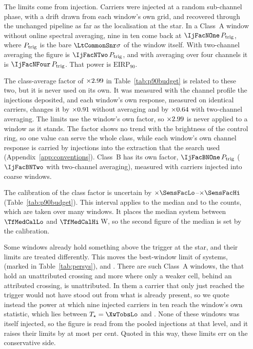 The limits come from injection. Carriers were injected at a random
sub-channel phase, with a drift drawn from each window's own grid, and
recovered through the unchanged pipeline as far as the localisation at the
star. In a Class~A window without online spectral averaging, nine in ten
come back at $\IjFacNOne\,P_{\rm trig}$, where $P_{\rm trig}$ is the bare
$\LtCommonSnr\sigma$ of the window itself. With two-channel averaging the
figure is $\IjFacNTwo\,P_{\rm trig}$, and with averaging over four channels
it is $\IjFacNFour\,P_{\rm trig}$. That power is $\mathrm{EIRP}_{90}$.

The class-average factor of $\times2.99$ in
Table~\ref{tab:p90budget} is related to these two, but it is never used on
its own. It was measured with the channel profile the injections deposited,
and each window's own response, measured on identical carriers, changes it
by $\times0.91$ without averaging and by $\times0.64$ with
two-channel averaging. The limits use the window's own factor, so
$\times2.99$ is never applied to a window as it stands. The
factor shows no trend with the brightness of the control ring, so one value
can serve the whole class, while each window's own channel response is
carried by injections into the extraction that the search used
(Appendix~\ref{app:conventions}). Class~B has its own factor,
$\IjFacBNOne\,P_{\rm trig}$ ($\IjFacBNTwo$ with two-channel averaging),
measured with \SensNToneCoarse{} carriers injected into \SensNInjCoarse{}
coarse windows.

The calibration of the class factor is uncertain by
$\times\SensFacLo$--$\times\SensFacHi$ (Table~\ref{tab:p90budget}). This
interval applies to the median and to the counts, which are taken over
many windows. It places the median system between $\TfMedCalLo$ and
$\TfMedCalHi$\,W, so the second figure of the median is set by the
calibration.

Some windows already hold something above the trigger at the star, and
their limits are treated differently. This moves the best-window limit of
\XwNSysWord{} systems, \XwSysNames{} (marked \XwMark{} in
Table~\ref{tab:persys}), and \XwHeadlineClause. There are \XwNWin{} such Class~A windows, the \CeObs{}
that hold an unattributed crossing and \XwNWinSecWord{} more where only a
weaker cell, behind an attributed crossing, is unattributed. In them a
carrier that only just reached the trigger would not have stood out from
what is already present, so we quote instead the power at which nine
injected carriers in ten reach the window's own statistic, which lies
between $T_\star=\XwTobsLo$ and \XwTobsHi. None of these windows was itself
injected, so the figure is read from the pooled injections at that level,
and it raises their limits by at most \XwFacMaxPct{} per cent. Quoted in
this way, these limits err on the conservative side.

